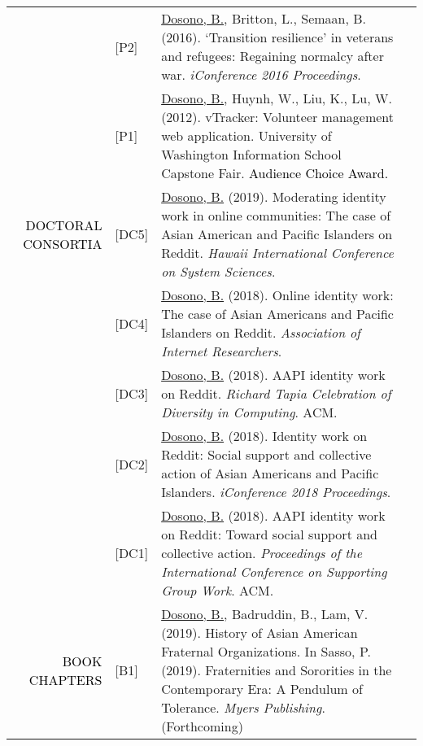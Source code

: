 \documentclass[12pt]{article}
\begin{document}
{{\begin{longtable}{Rp{1.0in}p{0.25in}p{4.75in}}
& \footnotesize{[P2]} & \href{https://doi.org/10.9776/16575}{{Dosono, B.}}, Britton, L., Semaan, B. (2016). ‘Transition resilience’ in veterans and refugees: Regaining normalcy after war. \textit{iConference 2016 Proceedings}. \\

& \footnotesize{[P1]} & \href{http://youtu.be/i5US90lHIac}{{Dosono, B.}}, Huynh, W., Liu, K., Lu, W. (2012). vTracker: Volunteer management web application. University of Washington Information School Capstone Fair. \textcolor{black}{Audience Choice Award.} \\

\textcolor{black}{\footnotesize{\uppercase{Doctoral Consortia}}} & \footnotesize{[DC5]} & 
 \href{http://hicss.hawaii.edu/doctoral-consortium/}{{Dosono, B.}} (2019). Moderating identity work in online communities: The case of Asian American and Pacific Islanders on Reddit. \textit{Hawaii International Conference on System Sciences}. \\

& \footnotesize{[DC4]} & \href{https://aoir.org/}{{Dosono, B.}} (2018). Online identity work: The case of Asian Americans and Pacific Islanders on Reddit. \textit{Association of Internet Researchers}. \\

& \footnotesize{[DC3]} & \href{http://tapiaconference.org/schedule/wednesday-september-19-2018/100pm-500pm/doctoral-consortium/aapi-identity-work-on-reddit-toward-social-support-and-collective-action/}{{Dosono, B.}} (2018). AAPI identity work on Reddit. \textit{Richard Tapia Celebration of Diversity in Computing}. ACM. \\

& \footnotesize{[DC2]} & \href{http://ischools.org/the-iconference/program/doctoral-colloquium/2018-doctoral-colloquium/}{{Dosono, B.}} (2018). Identity work on Reddit: Social support and collective action of Asian Americans and Pacific Islanders. \textit{iConference 2018 Proceedings}. \\

& \footnotesize{[DC1]} & \href{https://dl.acm.org/authorize?N42808}{{Dosono, B.}} (2018). AAPI identity work on Reddit: Toward social support and collective action. \textit{Proceedings of the International Conference on Supporting Group Work}. ACM. \\

\textcolor{black}{\footnotesize{\uppercase{Book Chapters}}} & \footnotesize{[B1]} & \href{http://myersedpress.com/BookDetail.aspx?productID=536594}{{Dosono, B.}}, Badruddin, B., Lam, V. (2019). History of Asian American Fraternal Organizations. In Sasso, P. (2019). Fraternities and Sororities in the Contemporary Era: A Pendulum of Tolerance. \textit{Myers Publishing}. (Forthcoming) \\


\end{longtable}}}
\end{document}
